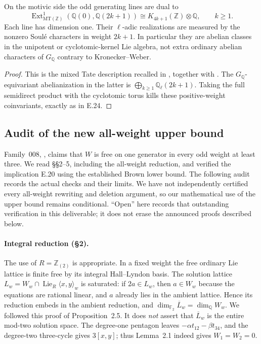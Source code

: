 On the motivic side the odd generating lines are dual to
\[
 \operatorname{Ext}^1_{\mathrm{MT}(\mathbb Z)}
       (\mathbb Q(0),\mathbb Q(2k+1))
       \cong K_{4k+1}(\mathbb Z)\otimes\mathbb Q,
       \qquad k\geq1.
\]
Each line has dimension one.  Their $\ell$-adic realizations are
measured by the nonzero Soul\'e characters in weight $2k+1$.
In particular they are abelian classes in the unipotent or
cyclotomic-kernel Lie algebra, not extra ordinary abelian characters
of $G_{\mathbb Q}$ contrary to Kronecker--Weber.
\begin{proof}
This is the mixed Tate description recalled in
\citet[\S1.1]{Brown2012}, together with
\citet[Theorem~7.3 and Remark~8.6]{HainMatsumoto2003}.
The $G_{\mathbb Q}$-equivariant abelianization in the latter is
$\bigoplus_{k\geq1}\mathbb Q_\ell(2k+1)$.
Taking the full semidirect product with the cyclotomic torus kills
these positive-weight coinvariants, exactly as in E.24.
\end{proof}

\subsection{Audit of the new all-weight upper bound}

Family~008, \citet[Theorem~1.1 and Corollary~5.4]{OpenAI2026DD},
claims that $W$ is free on one generator in every odd weight at least
three.  We read \S\S2--5, including the all-weight reduction, and
verified the implication E.20 using the established Brown lower bound.
The following audit records the actual checks and their limits.
We have not independently certified every all-weight rewriting and
deletion argument, so our mathematical use of the upper bound remains
conditional.  ``Open'' here records that outstanding verification in
this deliverable; it does not erase the announced proofs described
below.

\paragraph{Integral reduction (\S2).}
The use of $R=\mathbb Z_{(2)}$ is appropriate.  In a fixed weight the
free ordinary Lie lattice is finite free by its integral Hall--Lyndon
basis.  The solution lattice
$L_w=W_w\cap\operatorname{Lie}_R\langle x,y\rangle_w$ is saturated:
if $2a\in L_w$, then $a\in W_w$ because the equations are rational
linear, and $a$ already lies in the ambient lattice.  Hence its reduction
embeds in the ambient reduction, and
$\dim_{\mathbb F_2}\overline L_w=\dim_{\mathbb Q}W_w$.
We followed this proof of Proposition~2.5.  It does \emph{not} assert
that $\overline L_w$ is the entire mod-two solution space.
The degree-one pentagon leaves $-\alpha t_{12}-\beta t_{34}$,
and the degree-two three-cycle gives $3[x,y]$; thus Lemma~2.1 indeed
gives $W_1=W_2=0$.

